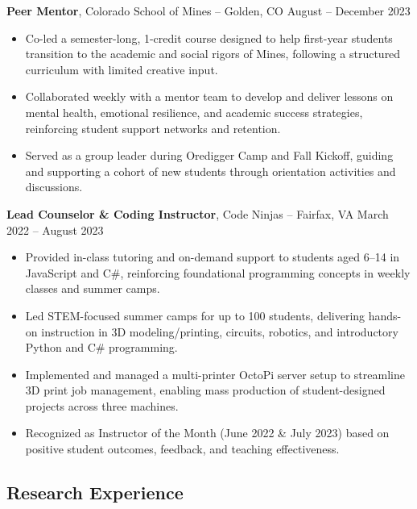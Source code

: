 \documentclass[11pt]{article}       %
\begin{document}
\textbf{Peer Mentor}, Colorado School of Mines -- Golden, CO \hfill August -- December 2023
\vspace{-5pt}
\begin{itemize}
  \item Co-led a semester-long, 1-credit course designed to help first-year students transition to the academic and social rigors of Mines, following a structured curriculum with limited creative input.
  \item Collaborated weekly with a mentor team to develop and deliver lessons on mental health, emotional resilience, and academic success strategies, reinforcing student support networks and retention.
  \item Served as a group leader during Oredigger Camp and Fall Kickoff, guiding and supporting a cohort of new students through orientation activities and discussions.
\end{itemize}

\textbf{Lead Counselor \& Coding Instructor}, Code Ninjas -- Fairfax, VA \hfill March 2022 -- August 2023
\vspace{-5pt}
\begin{itemize}
    \item Provided in-class tutoring and on-demand support to students aged 6–14 in JavaScript and C\#, reinforcing foundational programming concepts in weekly classes and summer camps.
    \item Led STEM-focused summer camps for up to 100 students, delivering hands-on instruction in 3D modeling/printing, circuits, robotics, and introductory Python and C\# programming.
    \item Implemented and managed a multi-printer OctoPi server setup to streamline 3D print job management, enabling mass production of student-designed projects across three machines.
    \item Recognized as Instructor of the Month (June 2022 \& July 2023) based on positive student outcomes, feedback, and teaching effectiveness.
\end{itemize}

\vspace{-5pt}
\subsection*{Research Experience}
\vspace{3pt}
\end{document}
